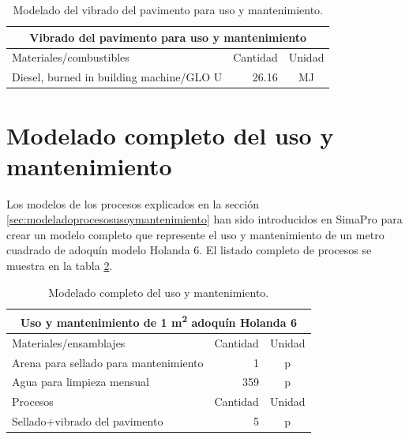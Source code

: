 \begin{table}[!htb]
\centering
\begin{tabular}{p{8cm}rc}
\toprule
\multicolumn{3}{c}{Vibrado del pavimento para uso y mantenimiento}\\
\midrule
Materiales/combustibles & Cantidad & Unidad\\
\midrule
Diesel, burned in building machine/GLO U & 26.16 & \si{MJ}\\
\bottomrule
\end{tabular}
\caption{Modelado del vibrado del pavimento para uso y mantenimiento.}
\label{modeladovibradouso}
\end{table}

\section{Modelado completo del uso y mantenimiento}

Los modelos de los procesos explicados en la sección \ref{sec:modeladoprocesosusoymantenimiento} han sido introducidos en SimaPro para crear un modelo completo que represente el uso y mantenimiento de un metro cuadrado de adoquín modelo Holanda 6. El listado completo de procesos se muestra en la tabla \ref{modeladocompletousoymantenimiento}.

\begin{table}[!htb]
\centering
\begin{tabular}{p{8cm}rc}
\toprule
\multicolumn{3}{c}{Uso y mantenimiento de 1 \si{m^2} adoquín Holanda 6}\\
\midrule
Materiales/ensamblajes & Cantidad & Unidad\\
\midrule
Arena para sellado para mantenimiento & 1 & p\\
Agua para limpieza mensual & 359 & p\\
\midrule
Procesos & Cantidad & Unidad\\
\midrule
Sellado+vibrado del pavimento & 5 & p\\
\bottomrule
\end{tabular}
\caption{Modelado completo del uso y mantenimiento.}
\label{modeladocompletousoymantenimiento}
\end{table}
